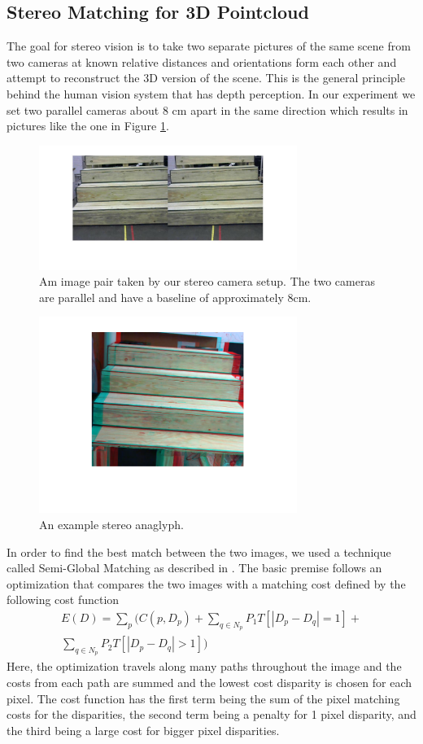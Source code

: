 \subsection{Stereo Matching for 3D Pointcloud} \label{stereo-matching-section}
The goal for stereo vision is to take two separate pictures of the same scene from two cameras at known relative distances and orientations form each other and attempt to reconstruct the 3D version of the scene. This is the general principle behind the human vision system that has depth perception. In our experiment we set two parallel cameras about 8 cm apart in the same direction which results in pictures like the one in Figure \ref{stereo-image-pair}.
\begin{figure}[!h]
\centering
\includegraphics[width=3.3in]{Sections/Figures/example_stereo_pair.jpg}
\caption{Am image pair taken by our stereo camera setup. The two cameras are parallel and have a baseline of approximately 8cm.}
\label{stereo-image-pair}
\end{figure}

\begin{figure}[!h]
\centering
\includegraphics[width=3.3in]{Sections/Figures/stereo_anaglyph.png}
\caption{An example stereo anaglyph.}
\label{stereo-anaglyph}
\end{figure}

In order to find the best match between the two images, we used a technique called Semi-Global Matching as described in \cite{1467526}. The basic premise follows an optimization that compares the two images with a matching cost defined by the following cost function
\begin{align*}
E(D) = \sum\limits_p(C(p,D_p)+\sum\limits_{q\in N_p}P_1T[|D_p-D_q|=1]+\\\sum\limits_{q\in N_p}P_2T[|D_p-D_q|>1])
\end{align*}
Here, the optimization travels along many paths throughout the image and the costs from each path are summed and the lowest cost disparity is chosen for each pixel. The cost function has the first term being the sum of the pixel matching costs for the disparities, the second term being a penalty for 1 pixel disparity, and the third being a large cost for bigger pixel disparities.

